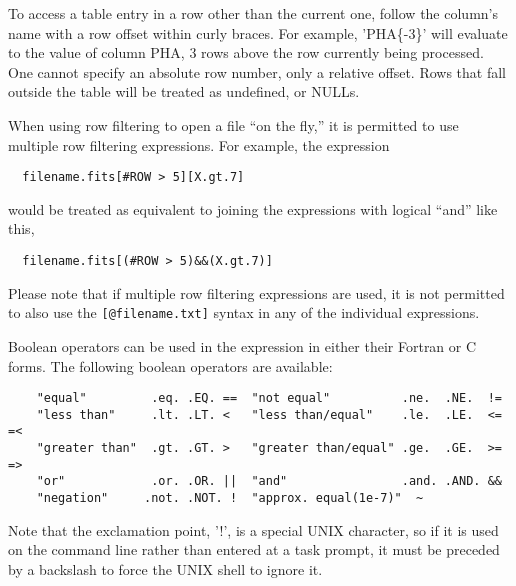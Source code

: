 \documentclass[11pt]{book}
\begin{document}
    To access a table entry in a row other  than the current one, follow
    the  column's name  with  a row  offset  within  curly  braces.  For
    example, 'PHA\{-3\}' will evaluate to the value  of column PHA, 3 rows
    above  the  row currently  being processed.   One  cannot specify an
    absolute row number, only a relative offset.  Rows that fall outside
    the table will be treated as undefined, or NULLs.

    When using row filtering to open a file ``on the fly,'' it is permitted
    to use multiple row filtering expressions.  For example, the expression
\begin{verbatim}
  filename.fits[#ROW > 5][X.gt.7]
\end{verbatim}
would be treated as equivalent to joining the expressions with logical ``and''
like this,
\begin{verbatim}
  filename.fits[(#ROW > 5)&&(X.gt.7)]
\end{verbatim}
Please note that if multiple row filtering expressions are used, it is
not permitted to also use the \verb+[@filename.txt]+ syntax in any
of the individual expressions.
    


    Boolean   operators can be  used in  the expression  in either their
    Fortran or C forms.  The following boolean operators are available:

\begin{verbatim}
    "equal"         .eq. .EQ. ==  "not equal"          .ne.  .NE.  !=
    "less than"     .lt. .LT. <   "less than/equal"    .le.  .LE.  <= =<
    "greater than"  .gt. .GT. >   "greater than/equal" .ge.  .GE.  >= =>
    "or"            .or. .OR. ||  "and"                .and. .AND. &&
    "negation"     .not. .NOT. !  "approx. equal(1e-7)"  ~
\end{verbatim}

Note that the exclamation point, '!', is a special UNIX character, so
if it is used on the command line rather than entered at a task
prompt, it must be preceded by a backslash to force the UNIX shell to
ignore it.
\end{document}
